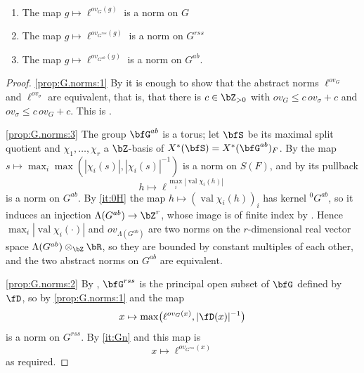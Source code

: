 \documentclass[12pt,a4paper]{amsart}%
\newcommand{\RamiA}[1]{{{#1}}}
\begin{document}
\begin{prop}\label{prop:G.norms}
$ $
    \begin{enumerate}
        \item\label{prop:G.norms:1} The map $g\mapsto \ell^{ov_G(g)}$ is a norm on $G$
        \item\label{prop:G.norms:2} The map $g\mapsto \ell^{ov_{G^{rss}}(g)}$ is a norm on $G^{rss}$
        \item\label{prop:G.norms:3} The map $g\mapsto \ell^{ov_{G^{ab}}(g)}$ is a norm on $G^{ab}$.
    \end{enumerate}
\end{prop}
\begin{proof}
\eqref{prop:G.norms:1} By  it is enough to show that
the abstract norms $\ell^{ov_G}$ and $\ell^{ov_\sigma}$ are equivalent, that is, that there is
$c\in\Z_{>0}$ with $ov_G\leq c\,ov_\sigma+c$ and $ov_\sigma\leq c\,ov_G+c$. This is .

\eqref{prop:G.norms:3} The group $\bfG^{ab}$ is a torus; let $\bfS$ be its maximal split quotient
and $\chi_1,\dots,\chi_r$ a $\Z$-basis of $X^*(\bfS)=X^*(\bfG^{ab})_F$. By
\cite[Example 18.2]{Kot} the map $s\mapsto\max_i\max(|\chi_i(s)|,|\chi_i(s)|^{-1})$ is a norm on
$S(F)$, and by \cite[Lemma 18.6]{Kot} its pullback
$$
h\mapsto \ell^{\,\max_i|\operatorname{val}\chi_i(h)|}
$$
is a norm on $G^{ab}$. By \eqref{it:0H} the map
$h\mapsto(\operatorname{val}\chi_i(h))_i$ has kernel ${}^0G^{ab}$, so it induces an injection
$\Lambda(G^{ab})\to\Z^r$, whose image is of finite index by \cite[V.2.6]{Ren}. Hence
$\max_i|\operatorname{val}\chi_i(\cdot)|$ and $ov_{\Lambda(G^{ab})}$ are two norms on the
$r$-dimensional real vector space $\Lambda(G^{ab})\otimes_\Z\R$, so they are bounded by constant
multiples of each other, and the two abstract norms on $G^{ab}$ are equivalent.

\eqref{prop:G.norms:2} By , $\bfG^{rss}$ is the principal open subset of $\bfG$
defined by $\fD$, so by \eqref{prop:G.norms:1} and \cite[Proposition 18.1(5)]{Kot} the map
$$
x\mapsto\max\bigl(\ell^{ov_G(x)},|\fD(x)|^{-1}\bigr)
$$
is a norm on $G^{rss}$. By \eqref{it:Gn} \RamiA{and  this map is $$x \mapsto \ell^{ov_{G^{rss}}(x)}$$ as required.}
\end{proof}
\end{document}
